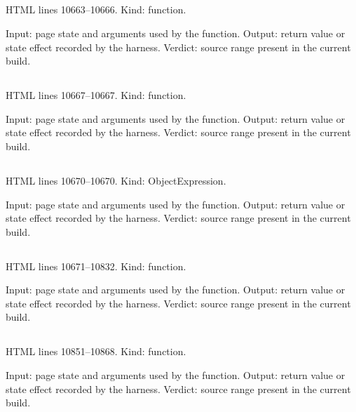 \subsection*{\texttt{}}
\label{vf_578_rdmlNum}
HTML lines 10663--10666. Kind: function.

Input: page state and arguments used by the function.
Output: return value or state effect recorded by the harness.
Verdict: source range present in the current build.

\subsection*{\texttt{}}
\label{vf_579_rdmlAttrId}
HTML lines 10667--10667. Kind: function.

Input: page state and arguments used by the function.
Output: return value or state effect recorded by the harness.
Verdict: source range present in the current build.

\subsection*{\texttt{}}
\label{vf_580_RDML_SAMPLE_ROLE}
HTML lines 10670--10670. Kind: ObjectExpression.

Input: page state and arguments used by the function.
Output: return value or state effect recorded by the harness.
Verdict: source range present in the current build.

\subsection*{\texttt{}}
\label{vf_581_rdmlParse}
HTML lines 10671--10832. Kind: function.

Input: page state and arguments used by the function.
Output: return value or state effect recorded by the harness.
Verdict: source range present in the current build.

\subsection*{\texttt{}}
\label{vf_582_runProcessingState}
HTML lines 10851--10868. Kind: function.

Input: page state and arguments used by the function.
Output: return value or state effect recorded by the harness.
Verdict: source range present in the current build.

